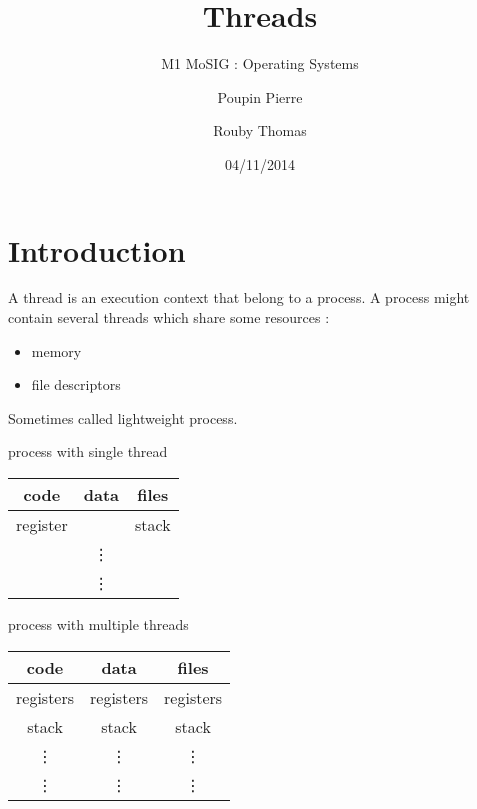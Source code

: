 \documentclass[a4paper,10pt]{article}
\title{\textbf{Threads}}
\subtitle{M1 MoSIG : Operating Systems}
\author{Poupin Pierre \and Rouby Thomas}
\date{04/11/2014}
\begin{document}
\maketitle


\section{Introduction}

A thread is an execution context that belong to a process.
A process might contain several threads which share some resources : 

\begin{itemize}
\item memory
\item file descriptors
\end{itemize}

Sometimes called lightweight process.

\vspace{0.2cm}
\begin{minipage}{0.4\textwidth}
    \begin{center}
        process with single thread
        \begin{tabular}{|c|c|c|}
            \hline
            code & data & files \\
            \hline
            register & & stack \\
            & \vdots & \\
            & \vdots & \\
            \hline
        \end{tabular}
    \end{center}
\end{minipage}
\begin{minipage}{0.4\textwidth}
    \begin{center}
        process with multiple threads
        \begin{tabular}{|c|c|c|}
            \hline
            code & data & files \\
            \hline
            registers & registers & registers \\
            stack& stack & stack \\
            \vdots & \vdots & \vdots \\
            \vdots & \vdots & \vdots \\
            \hline
        \end{tabular}
    \end{center}
\end{minipage}
\vspace{0.2cm}
\end{document}
